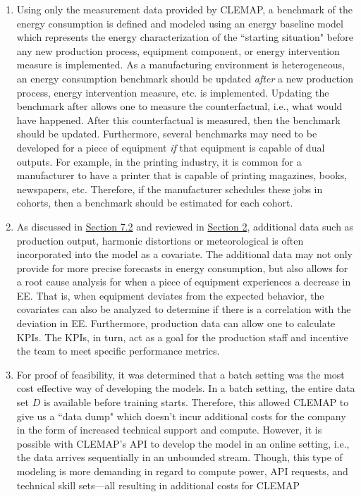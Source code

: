 \begin{enumerate}
    \item Using only the measurement data provided by CLEMAP, a benchmark of the energy consumption is defined and modeled using an energy baseline model which represents the energy characterization of the ``starting situation" before any new production process, equipment component, or energy intervention measure is implemented. As a manufacturing environment is heterogeneous, an energy consumption benchmark should be updated \textit{after} a new production process, energy intervention measure, etc. is implemented. Updating the benchmark after allows one to measure the counterfactual, i.e., what would have happened. After this counterfactual is measured, then the benchmark should be updated. Furthermore, several benchmarks may need to be developed for a piece of equipment \textit{if} that equipment is capable of dual outputs. For example, in the printing industry, it is common for a manufacturer to have a printer that is capable of printing magazines, books, newspapers, etc. Therefore, if the manufacturer schedules these jobs in cohorts, then a benchmark should be estimated for each cohort.
    
    \item As discussed in \hyperlink{subsection.7.2}{Section 7.2} and reviewed in \hyperlink{section.2}{Section 2}, additional data such as production output, harmonic distortions or meteorological is often incorporated into the model as a covariate. The additional data may not only provide for more precise forecasts in energy consumption, but also allows for a root cause analysis for when a piece of equipment experiences a decrease in EE. That is, when equipment deviates from the expected behavior, the covariates can also be analyzed to determine if there is a correlation with the deviation in EE. Furthermore, production data can allow one to calculate KPIs. The KPIs, in turn, act as a goal for the production staff and incentive the team to meet specific performance metrics. 
    
    \item For proof of feasibility, it was determined that a batch setting was the most cost effective way of developing the models. In a batch setting, the entire data set $D$ is available before training starts. Therefore, this allowed CLEMAP to give us a ``data dump" which doesn't incur additional costs for the company in the form of increased technical support and compute. However, it is possible with CLEMAP's \ac{API} to develop the model in an online setting, i.e., the data arrives sequentially in an unbounded stream. Though, this type of modeling is more demanding in regard to compute power, API requests, and technical skill sets—all resulting in additional costs for CLEMAP
    

\end{enumerate}
